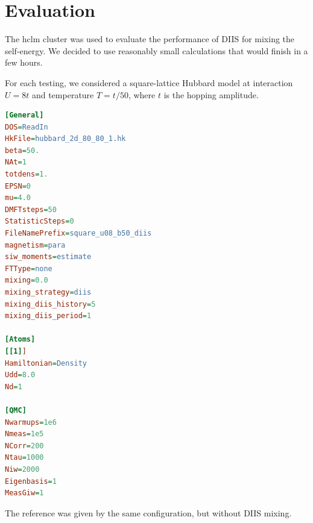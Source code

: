 \chapter{Evaluation}
\label{ch:evaluation}
The hclm cluster was used to evaluate the performance of DIIS for mixing the self-energy. We decided to use reasonably small calculations that would finish in a few hours.

For each testing, we considered a square-lattice Hubbard model at interaction $U=8t$ and temperature $T=t/50$, where $t$ is the hopping amplitude.


\begin{lstlisting}[label=lst:w2dyn_config, language=ini, caption=The w2dynmaics configuration for this case]
[General]
DOS=ReadIn
HkFile=hubbard_2d_80_80_1.hk
beta=50.
NAt=1
totdens=1.
EPSN=0
mu=4.0
DMFTsteps=50
StatisticSteps=0
FileNamePrefix=square_u08_b50_diis
magnetism=para
siw_moments=estimate
FTType=none
mixing=0.0
mixing_strategy=diis
mixing_diis_history=5
mixing_diis_period=1

[Atoms]
[[1]]
Hamiltonian=Density
Udd=8.0
Nd=1

[QMC]
Nwarmups=1e6
Nmeas=1e5
NCorr=200
Ntau=1000
Niw=2000
Eigenbasis=1 
MeasGiw=1
\end{lstlisting}

The reference was given by the same configuration, but without DIIS mixing.

